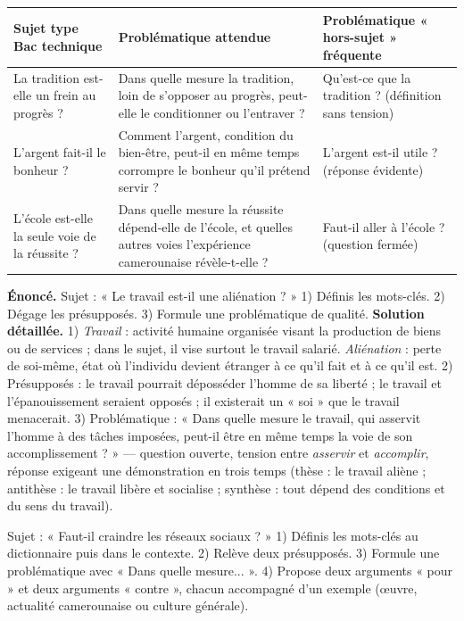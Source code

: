 \documentclass[11pt]{article}
\begin{document}
\begin{center}
\begin{tabularx}{\linewidth}{|X|X|X|}
\hline
\rowcolor{popblueL} \textbf{Sujet type Bac technique} & \textbf{Problématique attendue} & \textbf{Problématique « hors-sujet » fréquente} \\
\hline
La tradition est-elle un frein au progrès ? & Dans quelle mesure la tradition, loin de s'opposer au progrès, peut-elle le conditionner ou l'entraver ? & Qu'est-ce que la tradition ? (définition sans tension) \\
\hline
L'argent fait-il le bonheur ? & Comment l'argent, condition du bien-être, peut-il en même temps corrompre le bonheur qu'il prétend servir ? & L'argent est-il utile ? (réponse évidente) \\
\hline
L'école est-elle la seule voie de la réussite ? & Dans quelle mesure la réussite dépend-elle de l'école, et quelles autres voies l'expérience camerounaise révèle-t-elle ? & Faut-il aller à l'école ? (question fermée) \\
\hline
\end{tabularx}
\end{center}

\begin{exoresolu}
\textbf{Énoncé.} Sujet : « Le travail est-il une aliénation ? » 1) Définis les mots-clés. 2) Dégage les présupposés. 3) Formule une problématique de qualité.
\tcblower
\textbf{Solution détaillée.}
1) \emph{Travail} : activité humaine organisée visant la production de biens ou de services ; dans le sujet, il vise surtout le travail salarié. \emph{Aliénation} : perte de soi-même, état où l'individu devient étranger à ce qu'il fait et à ce qu'il est.
2) Présupposés : le travail pourrait déposséder l'homme de sa liberté ; le travail et l'épanouissement seraient opposés ; il existerait un « soi » que le travail menacerait.
3) Problématique : « Dans quelle mesure le travail, qui asservit l'homme à des tâches imposées, peut-il être en même temps la voie de son accomplissement ? » — question ouverte, tension entre \emph{asservir} et \emph{accomplir}, réponse exigeant une démonstration en trois temps (thèse : le travail aliène ; antithèse : le travail libère et socialise ; synthèse : tout dépend des conditions et du sens du travail).
\end{exoresolu}

\begin{exercice}
Sujet : « Faut-il craindre les réseaux sociaux ? » 1) Définis les mots-clés au dictionnaire puis dans le contexte. 2) Relève deux présupposés. 3) Formule une problématique avec « Dans quelle mesure... ». 4) Propose deux arguments « pour » et deux arguments « contre », chacun accompagné d'un exemple (œuvre, actualité camerounaise ou culture générale).
\end{exercice}
\end{document}
